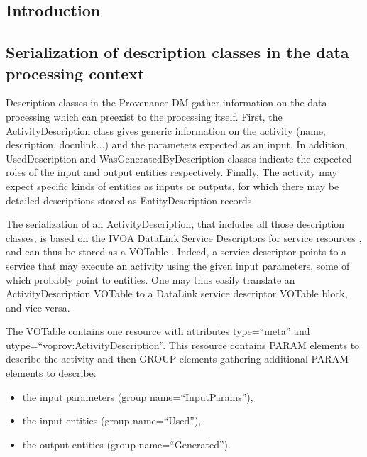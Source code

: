 \subsection{Introduction}
\label{sec:intro-serialization}


\subsection{Serialization of description classes in the data processing context}
\label{sec:description-serialization}

Description classes in the Provenance DM gather information on the data processing which can preexist to the processing itself.
First, the ActivityDescription class gives generic information on the activity (name, description, doculink...) and the parameters expected as an input. In addition, UsedDescription and WasGeneratedByDescription classes indicate the expected roles of the input and output entities respectively. Finally, The activity may expect specific kinds of entities as inputs or outputs, for which there may be detailed descriptions stored as EntityDescription records.

The serialization of an ActivityDescription, that includes all those description classes, is based on the IVOA DataLink Service Descriptors for service resources \citep{std:Datalink}, and can thus be stored as a VOTable \citep{std:VOTABLE}. Indeed, a service descriptor points to a service that may execute an activity using the given input parameters, some of which probably point to entities. One may thus easily translate an ActivityDescription VOTable to a DataLink service descriptor VOTable block, and vice-versa.

The VOTable contains one resource with attributes type=``meta'' and utype=``voprov:ActivityDescription''. This resource contains PARAM elements to describe the activity and then GROUP elements gathering additional PARAM elements to describe:
\begin{itemize}
 \item the input parameters (group name=``InputParams''),
 \item the input entities (group name=``Used''),
 \item the output entities (group name=``Generated''). 
 \end{itemize}
 
